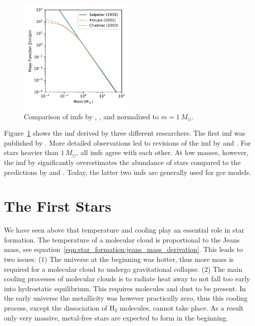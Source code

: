 \begin{figure}[tb]
    \centering
    \includegraphics[width=0.5\textwidth]{graphics/star_formation/imf}
    \caption{Comparison of \acp{imf} by \citet{salpeter55}, \citet{kroupa01}, and \citet{chabrier03} normalized to $m=1\,M_\odot$.}
    \label{fig:star_formation:imf}
\end{figure}
Figure~\ref{fig:star_formation:imf} shows the \ac{imf} derived by three different researchers. The first \ac{imf} was published by \citet{salpeter55}. More detailed observations led to revisions of the \ac{imf} by \citet{kroupa01} and \citet{chabrier03}. 
For stars heavier than $1\,M_\odot$, all \acp{imf} agree with each other. At low masses, however, the \ac{imf} by \citet{salpeter55} significantly overestimates the abundance of stars compared to the predictions by \citet{kroupa01} and \citet{chabrier03}. Today, the latter two \acp{imf} are generally used for \ac{gce} models.


\section{The First Stars}\label{sec:star_formation:first_stars}

We have seen above that temperature and cooling play an essential role in star formation. The temperature of a molecular cloud is proportional to the Jeans mass, see equation~\eqref{eqn:star_formation:jeans_mass_derivation}. This leads to two issues: (1) The universe at the beginning was hotter, thus more mass is required for a molecular cloud to undergo gravitational collapse. (2) The main cooling processes of molecular clouds is to radiate heat away to not fall too early into hydrostatic equilibrium. This requires molecules and dust to be present. In the early universe the metallicity was however practically zero, thus this cooling process, except the dissociation of H$_2$ molecules, cannot take place. As a result only very massive, metal-free stars are expected to form in the beginning. 

